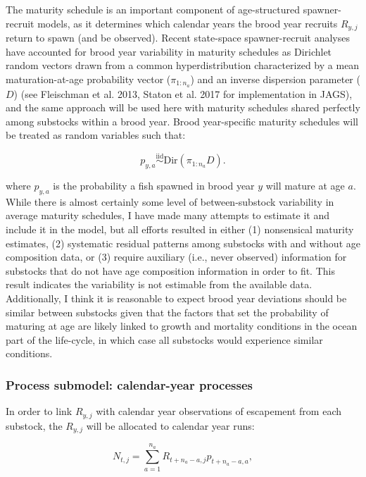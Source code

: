 \documentclass[12pt,]{book}
\theoremstyle{definition}
\theoremstyle{definition}
\theoremstyle{definition}
\theoremstyle{remark}
\begin{document}
The maturity schedule is an important component of age-structured
spawner-recruit models, as it determines which calendar years the brood
year recruits \(R_{y,j}\) return to spawn (and be observed). Recent
state-space spawner-recruit analyses have accounted for brood year
variability in maturity schedules as Dirichlet random vectors drawn from
a common hyperdistribution characterized by a mean maturation-at-age
probability vector (\(\pi_{1:n_a}\)) and an inverse dispersion parameter
(\(D\)) (see Fleischman et al. 2013, Staton et al. 2017 for
implementation in JAGS), and the same approach will be used here with
maturity schedules shared perfectly among substocks within a brood year.
Brood year-specific maturity schedules will be treated as random
variables such that:

\begin{equation}
  p_{y,a} \stackrel{\text{iid}}{\sim} \text{Dir}(\pi_{1:n_a} D). 
  \label{eq:dirichlet}
\end{equation}

\noindent
where \(p_{y,a}\) is the probability a fish spawned in brood year \(y\)
will mature at age \(a\). While there is almost certainly some level of
between-substock variability in average maturity schedules, I have made
many attempts to estimate it and include it in the model, but all
efforts resulted in either (1) nonsensical maturity estimates, (2)
systematic residual patterns among substocks with and without age
composition data, or (3) require auxiliary (i.e., never observed)
information for substocks that do not have age composition information
in order to fit. This result indicates the variability is not estimable
from the available data. Additionally, I think it is reasonable to
expect brood year deviations should be similar between substocks given
that the factors that set the probability of maturing at age are likely
linked to growth and mortality conditions in the ocean part of the
life-cycle, in which case all substocks would experience similar
conditions.

\subsubsection{Process submodel: calendar-year
processes}\label{process-submodel-calendar-year-processes}

\noindent
In order to link \(R_{y,j}\) with calendar year observations of
escapement from each substock, the \(R_{y,j}\) will be allocated to
calendar year runs:

\begin{equation}
  N_{t,j}=\sum_{a=1}^{n_a} R_{t+n_a-a,j} p_{t+n_a-a,a},
  \label{eq:tsm-get-N}
\end{equation}
\end{document}
